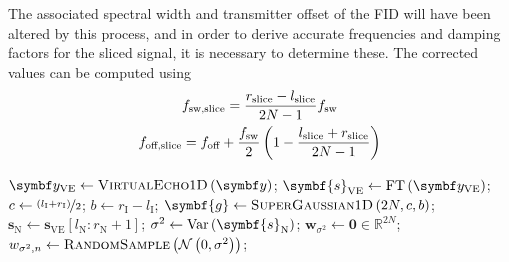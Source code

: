 The associated spectral width and transmitter offset of the \ac{FID} will have
been altered by this process, and in order to derive accurate frequencies and
damping factors for the sliced signal, it is necessary to determine these. The
corrected values can be computed using
\begin{subequations}
    \begin{gather}
        f_{\text{sw,slice}} = \frac{r_{\text{slice}} - l_{\text{slice}}}{2N - 1} f_{\mathrm{sw}}\\
        f_{\text{off,slice}} = f_{\text{off}} + \frac{f_{\mathrm{sw}}}{2} \left(
            1 - \frac{l_{\text{slice}} + r_{\text{slice}}}{2N - 1}
        \right)
    \end{gather}
\end{subequations}


\begin{algorithm}
    \begin{algorithmic}
        \caption[
            The filtering procedure for 1D data.
        ]
        {
            The filtering procedure for 1D data.
            $l/r_{\text{I/N}}$ denotes the left ($l$)/right ($r$) bound of the
            region of interest (I)/noise region (N), as a vector index.
            All of these values should be members of the set $\lbrace 0,
            \cdots, 2N - 1 \rbrace$.
            These would typically be provided in units of \unit{\hertz} or
            \unit{\partspermillion} by a user; conversion to indices can
            be carried out using \cref{eq:fidx}.
        }
        \label{alg:filter-1d}
            \State $\by_{\text{VE}} \gets \textsc{VirtualEcho$1$D}\left(\by\right)$;
            \State $\symbf{s}_{\text{VE}} \gets \FT\left(\by_{\text{VE}}\right)$;
            \State $c \gets \nicefrac{\left(l_{\text{I}} + r_{\text{I}}\right)}{2}$;
            \State $b \gets r_{\text{I}} - l_{\text{I}}$;
            \State $\symbf{g} \gets \textsc{SuperGaussian$1$D}\left(2N, c, b\right)$;
            \State $\symbf{s}_{\text{N}} \gets \symbf{s}_{\text{VE}} \left[
                l_{\text{N}} : r_{\text{N}} + 1
            \right]
            $;
            \State $\sigma^2 \gets \Var\left(\symbf{s}_{\text{N}}\right)$;
            \State $\symbf{w}_{\sigma^2} \gets \symbf{0} \in \mathbb{R}^{2N}$;
            \State $w_{\sigma^2,n} \gets \textsc{RandomSample}\left(\mathcal{N}\left(0, \sigma^2\right)\right)$;

\end{algorithmic}
\end{algorithm}
